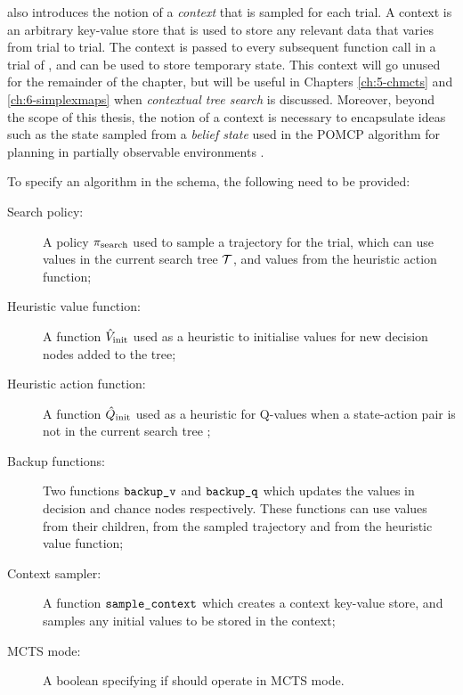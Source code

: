         \thtspp\ewe also introduces the notion of a \textit{context} that is sampled for each trial. A context is an arbitrary key-value store that is used to store any relevant data that varies from trial to trial. The context is passed to every subsequent function call in a trial of \thtspp, and can be used to store temporary state. This context will go unused for the remainder of the chapter, but will be useful in Chapters \ref{ch:5-chmcts} and \ref{ch:6-simplexmaps} when \textit{contextual tree search} is discussed. Moreover, beyond the scope of this thesis, the notion of a context is necessary to encapsulate ideas such as the state sampled from a \textit{belief state} used in the POMCP algorithm for planning in partially observable environments .

        To specify an algorithm in the \thtspp\ewe schema, the following need to be provided:
        \begin{description}
            \item[Search policy:]
                A policy ${\pi_{\textnormal{search}}}$ used to sample a trajectory for the trial, which can use values in the current search tree $\mathcal{T}$, and values from the heuristic action function;
            \item[Heuristic value function:]
                A function ${\hat{V}_{\textnormal{init}}}$ used as a heuristic to initialise values for new decision nodes added to the tree;
            \item[Heuristic action function:]
                A function ${\hat{Q}_{\textnormal{init}}}$ used as a heuristic for Q-values when a state-action pair is not in the current search tree ;
            \item[Backup functions:]
                Two functions ${\textnormal{\texttt{backup\_v}}}$ and ${\textnormal{\texttt{backup\_q}}}$ which updates the values in decision and chance nodes respectively. These functions can use values from their children, from the sampled trajectory and from the heuristic value function;
            \item[Context sampler:]
                A function ${\textnormal{\texttt{sample\_context}}}$ which creates a context key-value store, and samples any initial values to be stored in the context;
            \item[MCTS mode:]
                A boolean \mctsmode specifying if \thtspp\ewe should operate in MCTS mode.
        \end{description}

